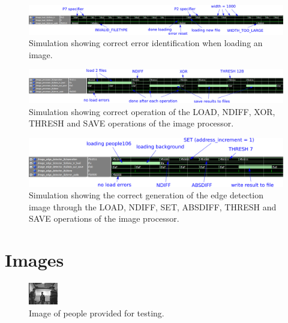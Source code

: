 \documentclass[a4paper, 10pt, titlepage]{article}
\begin{document}
\begin{figure}[!htb]
    \centering
    \includegraphics[width=0.8\linewidth]{image_load_errors_sim.png}
    \caption{Simulation showing correct error identification when loading an image.}
    \label{fig:image_load_sim}
\end{figure}

\begin{figure}[!htb]
    \centering
    \includegraphics[width=0.8\linewidth]{image_processor_sim.png}
    \caption{Simulation showing correct operation of the LOAD, NDIFF, XOR, THRESH and SAVE operations of the image processor.}
    \label{fig:image_operations_sim}
\end{figure}

\begin{figure}[!htb]
    \centering
    \includegraphics[width=0.8\linewidth]{edge_detect_sim.png}
    \caption{Simulation showing the correct generation of the edge detection image through the LOAD, NDIFF, SET, ABSDIFF, THRESH and SAVE operations of the image processor.}
    \label{fig:edge_detect_sim}
\end{figure}

\clearpage

\section{Images} \label{sec:images}

\begin{figure}[!htb]
    \centering
    \includegraphics[width=0.45\linewidth]{people106.png}
    \caption{Image of people provided for testing.}
    \label{fig:people106_image}
\end{figure}
\end{document}
